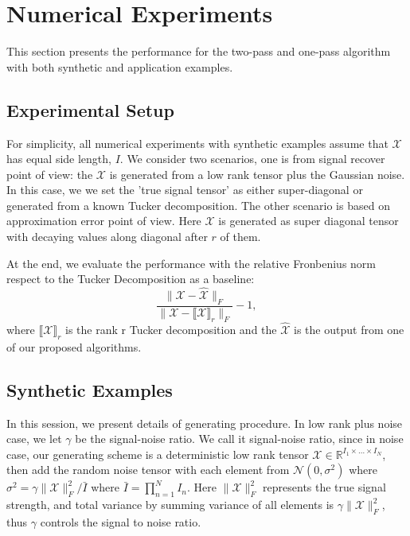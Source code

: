 \section{Numerical Experiments}
This section presents the performance for the two-pass and one-pass algorithm with both synthetic and application examples. 

\subsection{Experimental Setup}
For simplicity, all numerical experiments with synthetic examples assume that $\mathscr{X}$ has equal side length, $I$. We consider two scenarios, one is from signal recover point of view: the $\mathscr{X}$ is generated from a low rank tensor plus the Gaussian noise. In this case, we we set the 'true signal tensor' as either super-diagonal or generated from a known Tucker decomposition. 
The other scenario is based on approximation error point of view. Here $\mathscr{X}$ is generated as super diagonal tensor with decaying values along diagonal after $r$ of them. \par 
At the end, we evaluate the performance with the relative Fronbenius norm respect to the Tucker Decomposition as a baseline: 
\begin{equation}
\frac{\|\mathscr{X} -  \hat{\mathscr{X}}\|_F}{\|\mathscr{X}-\llbracket\mathscr{X}\rrbracket_r\|_F} - 1, 
\end{equation}
where $\llbracket \mathscr{X} \rrbracket_r$ is the rank r Tucker decomposition and the $\hat{\mathscr{X}}$ is the output from one of our proposed algorithms. 

\subsection{Synthetic Examples} 
In this session, we present details of generating procedure. In low rank plus noise case, we let $\gamma$ be the signal-noise ratio. We call it signal-noise ratio, since in noise case, our generating scheme is a deterministic low rank tensor $\mathscr{X}\in \mathbb{R}^{I_1\times \dots \times I_N}$, then add the random noise tensor with each element from $\mathcal{N}(0, \sigma^2)$ where $\sigma^2 = \gamma \|\mathscr{X}\|_F^2 / \bar{I}$ where $\bar{I} = \prod_{n=1}^N I_n$. Here $\|\mathscr{X}\|_F^2$ represents the true signal strength, and total variance by summing variance of all elements is $\gamma \|\mathscr{X}\|_F^2$, thus $\gamma$ controls the signal to noise ratio.

